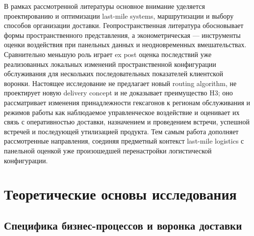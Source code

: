 \documentclass[14pt,a4paper]{extarticle}
\begin{document}
В рамках рассмотренной литературы основное внимание уделяется проектированию и оптимизации last-mile systems, маршрутизации и выбору способов организации доставки. Геопространственная литература обосновывает формы пространственного представления, а эконометрическая --- инструменты оценки воздействия при панельных данных и неодновременных вмешательствах. Сравнительно меньшую роль играет ex post оценка последствий уже реализованных локальных изменений пространственной конфигурации обслуживания для нескольких последовательных показателей клиентской воронки. Настоящее исследование не предлагает новый routing algorithm, не проектирует новую delivery concept и не доказывает преимущество H3; оно рассматривает изменения принадлежности гексагонов к регионам обслуживания и режимов работы как наблюдаемое управленческое воздействие и оценивает их связь с оперативностью доставки, назначением и проведением встречи, успешной встречей и последующей утилизацией продукта. Тем самым работа дополняет рассмотренные направления, соединяя предметный контекст last-mile logistics с панельной оценкой уже произошедшей перенастройки логистической конфигурации.

\section{Теоретические основы исследования}

\subsection{Специфика бизнес-процессов и воронка доставки}
\end{document}
